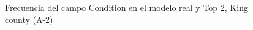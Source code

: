 \begin{figure}[H]
    \centering
    
    \caption{Frecuencia del campo Condition en el modelo real y Top 2, King county (A-2)}
    \label{frecuency-top2-condition}
\end{figure}
